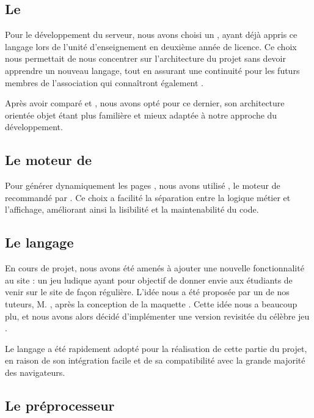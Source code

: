 \subsection{Le  }
\label{subsec:symfony}

Pour le développement du serveur, nous avons choisi un  , ayant déjà appris ce langage lors de l’unité d’enseignement  en deuxième année de licence. Ce choix nous permettait de nous concentrer sur l’architecture du projet sans devoir apprendre un nouveau langage, tout en assurant une continuité pour les futurs membres de l’association qui connaîtront également .

Après avoir comparé  et , nous avons opté pour ce dernier, son architecture orientée objet étant plus familière et mieux adaptée à notre approche du développement.

\subsection{Le moteur de  }
\label{subsec:twig}

Pour générer dynamiquement les pages , nous avons utilisé , le moteur de  recommandé par . Ce choix a facilité la séparation entre la logique métier et l'affichage, améliorant ainsi la lisibilité et la maintenabilité du code.

\subsection{Le langage }
\label{subsec:javascript}

En cours de projet, nous avons été amenés à ajouter une nouvelle fonctionnalité au site : un jeu ludique ayant pour objectif de donner envie aux étudiants de venir sur le site de façon régulière.
L'idée nous a été proposée par un de nos tuteurs, M. , après la conception de la maquette .
Cette idée nous a beaucoup plu, et nous avons alors décidé d'implémenter une version revisitée du célèbre jeu .

Le langage  a été rapidement adopté pour la réalisation de cette partie du projet, en raison de son intégration facile et de sa compatibilité avec la grande majorité des navigateurs.

\subsection{Le préprocesseur }
\label{subsec:sass}

